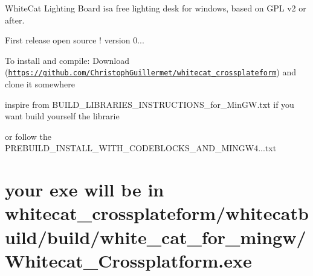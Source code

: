 White\+Cat Lighting Board isa free lighting desk for windows, based on G\+P\+L v2 or after.

First release open source ! version 0...

To install and compile\+: Download (\href{https://github.com/ChristophGuillermet/whitecat_crossplateform}{\tt https\+://github.\+com/\+Christoph\+Guillermet/whitecat\+\_\+crossplateform}) and clone it somewhere

inspire from B\+U\+I\+L\+D\+\_\+\+L\+I\+B\+R\+A\+R\+I\+E\+S\+\_\+\+I\+N\+S\+T\+R\+U\+C\+T\+I\+O\+N\+S\+\_\+for\+\_\+\+Min\+G\+W.\+txt if you want build yourself the librarie

or follow the P\+R\+E\+B\+U\+I\+L\+D\+\_\+\+I\+N\+S\+T\+A\+L\+L\+\_\+\+W\+I\+T\+H\+\_\+\+C\+O\+D\+E\+B\+L\+O\+C\+K\+S\+\_\+\+A\+N\+D\+\_\+\+M\+I\+N\+G\+W4...\+txt

\section*{your exe will be in whitecat\+\_\+crossplateform/whitecatbuild/build/white\+\_\+cat\+\_\+for\+\_\+mingw/\+Whitecat\+\_\+\+Crossplatform.\+exe }
